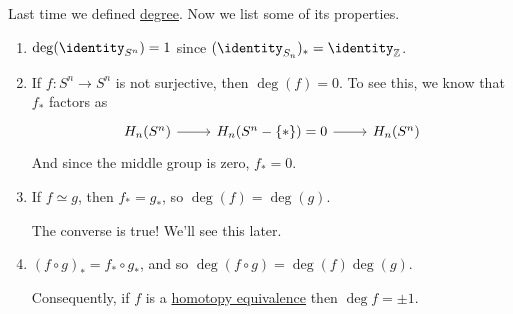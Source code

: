 \begin{prev}
	Last time we defined \hyperref[def:degree]{degree}. Now we list some of its properties.
\end{prev}

\begin{remark}
	\begin{enumerate}
		\item \(\deg(\identity_{S^n}) = 1\) since \((\identity_{S_n})_\ast = \identity_{\mathbb{Z}}\).
		\item If \(f \colon S^n \to S^n\) is not surjective, then \(\deg(f) = 0\). To see this, we know that \(f_\ast\) factors as
		      \[
			      \begin{tikzcd}
				      {H_n(S^n)} & {H_n(S^n-\{\ast\})=0} & {H_n(S^n)}
				      \arrow[from=1-1, to=1-2]
				      \arrow[from=1-2, to=1-3]
			      \end{tikzcd}
		      \]
		      And since the middle group is zero, $f_\ast = 0$.
		\item If \(f \simeq g\), then \(f_\ast = g_\ast\), so \(\deg(f) = \deg(g)\).
		      \begin{note}
			      The converse is true! We'll see this later.
		      \end{note}
		\item \((f \circ g)_\ast = f_\ast \circ g_\ast\), and so \(\deg(f \circ g) = \deg(f)\deg(g)\).

		      \par Consequently, if \(f\) is a \hyperref[def:homotopy-equivalence]{homotopy equivalence} then \(\deg f = \pm 1\).


\end{enumerate}
\end{remark}
